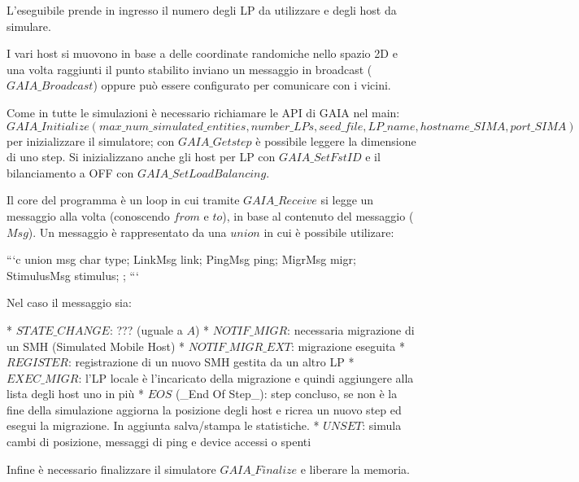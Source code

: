 L'eseguibile prende in ingresso il numero degli LP da utilizzare e degli host da simulare.

I vari host si muovono in base a delle coordinate randomiche nello spazio 2D e una volta raggiunti il punto stabilito inviano un messaggio in broadcast ($GAIA\_Broadcast$) oppure può essere configurato per comunicare con i vicini.

Come in tutte le simulazioni è necessario richiamare le API di GAIA nel main: $GAIA\_Initialize(max\_num\_simulated\_entities, number\_LPs, seed\_file, LP\_name, hostname\_SIMA, port\_SIMA)$ per inizializzare il simulatore; con $GAIA\_Getstep$ è possibile leggere la dimensione di uno step. Si inizializzano anche gli host per LP con $GAIA\_SetFstID$ e il bilanciamento a OFF con $GAIA\_SetLoadBalancing$.

Il core del programma è un loop in cui tramite $GAIA\_Receive$ si legge un messaggio alla volta (conoscendo $from$ e $to$), in base al contenuto del messaggio ($Msg$). Un messaggio è rappresentato da una $union$ in cui è possibile utilizare:

```c
union msg {
    char type;
    LinkMsg link;
    PingMsg ping;
    MigrMsg migr;
    StimulusMsg stimulus;
};
```

Nel caso il messaggio sia:

* $STATE\_CHANGE$: ??? (uguale a $A$)
* $NOTIF\_MIGR$: necessaria migrazione di un SMH (Simulated Mobile Host)
* $NOTIF\_MIGR\_EXT$: migrazione eseguita
* $REGISTER$: registrazione di un nuovo SMH gestita da un altro LP
* $EXEC\_MIGR$: l'LP locale è l'incaricato della migrazione e quindi aggiungere alla lista degli host uno in più
* $EOS$ (\_End Of Step\_): step concluso, se non è la fine della simulazione aggiorna la posizione degli host e ricrea un nuovo step ed esegui la migrazione. In aggiunta salva/stampa le statistiche.
* $UNSET$:  simula cambi di posizione, messaggi di ping e device accessi o spenti

Infine è necessario finalizzare il simulatore $GAIA\_Finalize$ e liberare la memoria.

